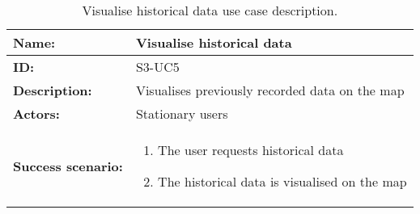 \begin{table}[htbp]
    \centering
    \begin{tabularx}{\textwidth}{lX}
        \toprule
        \textbf{Name:}  & Visualise historical data \\ \midrule
        \textbf{ID:}    & S3-UC5 \\ \midrule
        \textbf{Description:} & Visualises previously recorded data on the map \\ \midrule
        \textbf{Actors:} & Stationary users \\ \midrule
        \textbf{Success scenario:} & 
        \begin{enumerate}
            \item The user requests historical data
            \item The historical data is visualised on the map
        \end{enumerate}
        \\ \bottomrule
    \end{tabularx}
    \caption{Visualise historical data use case description.}
    \label{tab:s3-uc5}
\end{table}